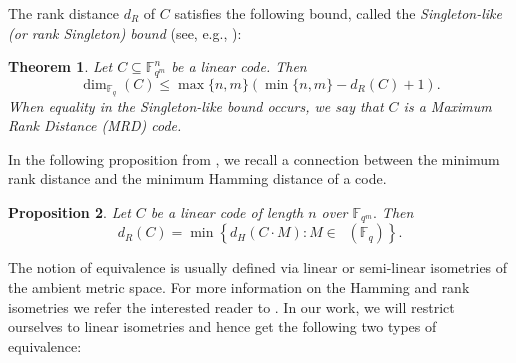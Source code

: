 \documentclass[12pt,paper]{article}
\theoremstyle{plain}
\newtheorem{theorem}{Theorem}[section] %
\newtheorem{proposition}[theorem]{Proposition}
\DeclareMathOperator{\GL}{GL_{n}}
\begin{document}
The rank distance $d_R$ of $C$ satisfies the following bound, called the \emph{Singleton-like (or rank Singleton) bound} (see, e.g., \cite{gabidulin2025rank}):
\begin{theorem}
Let $C\subseteq \mathbb{F}_{q^m}^n$ be a linear code. Then
    $$
\dim_{\mathbb{F}_{q}}(C) \leq \max \{n, m\}(\min \{n, m \}-d_R(C)+1) .
$$
 When equality in the Singleton-like bound occurs, we say  that $C$ is a  \emph{Maximum Rank Distance (MRD)} code.
\end{theorem}

 
In the following proposition from \cite[Proposition 7]{Alfarano2021}, we recall a connection between the minimum rank distance and the minimum Hamming distance of a code.
\begin{proposition}\label{Prop_Hamming_rank}
\cite[Proposition 7]{Alfarano2021}
 Let $C$ be a linear code of length $n$ over $ \mathbb{F}_{q^m}.$ Then
$$ d_R(C)=\min \left\{d_H(C \cdot M): M \in \GL(\mathbb{F}_{q})\right\} .$$
\end{proposition}




\vspace{0.2cm}

The notion of equivalence is usually defined via linear or semi-linear isometries of the ambient metric space. For more information on the Hamming and rank isometries we refer the interested reader to \cite{Berger2003Isometries,Huffman2003,Neri2020}. In our work, we will restrict ourselves to linear isometries and hence get the following two types of equivalence:
\end{document}

